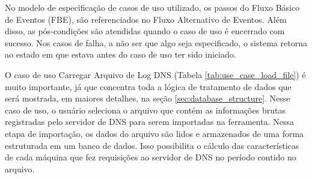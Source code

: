 No modelo de especificação de casos de uso utilizado, os passos do Fluxo Básico de Eventos (FBE), são referenciados no Fluxo Alternativo de Eventos. Além disso, as pós-condições são atendidas quando o caso de uso é encerrado com sucesso. Nos casos de falha, a não ser que algo seja especificado, o sistema retorna ao estado em que estava antes do caso de uso ter sido iniciado.

O caso de uso Carregar Arquivo de Log DNS (Tabela \ref{tab:use_case_load_file}) é muito importante, já que concentra toda a lógica de tratamento de dados que será mostrada, em maiores detalhes, na seção \ref{sec:database_structure}. Nesse caso de uso, o usuário seleciona o arquivo que contém as informações brutas registradas pelo servidor de DNS para serem importadas na ferramenta. Nessa etapa de importação, os dados do arquivo são lidos e armazenados de uma forma estruturada em um banco de dados. Isso possibilita o cálculo das características de cada máquina que fez requisições ao servidor de DNS no período contido no arquivo.

